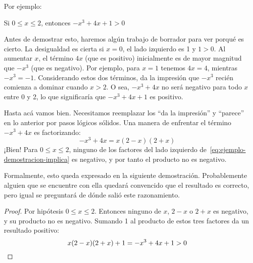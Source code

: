   Por ejemplo:
  \begin{proposition}
    Si \(0 \le x \le 2\),
    entonces \(-x^3 + 4 x + 1 > 0\)
  \end{proposition}
  Antes de demostrar esto,
  haremos algún trabajo de borrador para ver porqué es cierto.
  La desigualdad es cierta si \(x = 0\),
  el lado izquierdo es 1 y \(1 > 0\).
  Al aumentar \(x\),
  el término \(4 x\)
  (que es positivo)
  inicialmente es de mayor magnitud que \(-x^3\)
  (que es negativo).
  Por ejemplo,
  para \(x = 1\) tenemos \(4 x = 4\),
  mientras \(-x^3 = -1\).
  Considerando estos dos términos,
  da la impresión que \(-x^3\)
  recién comienza a dominar cuando \(x > 2\).
  O sea,
  \(-x^3 + 4 x\) no será negativo para todo \(x\) entre 0 y 2,
  lo que significaría que \(-x^3 + 4 x + 1\) es positivo.

  Hasta acá vamos bien.
  Necesitamos reemplazar los ``da la impresión'' y ``parece''
  en lo anterior por pasos lógicos sólidos.
  Una manera de enfrentar el término \(-x^3 + 4 x\) es factorizando:
  \begin{equation}
    \label{eq:ejemplo-demostracion-implica}
    -x^3 + 4 x = x (2 - x) (2 + x)
  \end{equation}
  ¡Bien!
  Para \(0 \le x \le 2\),
  ninguno de los factores
  del lado izquierdo de~\eqref{eq:ejemplo-demostracion-implica}
  es negativo,
  y por tanto el producto no es negativo.

  Formalmente,
  esto queda expresado en la siguiente demostración.
  Probablemente alguien que se encuentre con ella quedará convencido
  que el resultado es correcto,
  pero igual se preguntará de dónde salió este razonamiento.

  \begin{proof}
    Por hipótesis \(0 \le x \le 2\).
    Entonces ninguno de \(x\), \(2 - x\) o \(2 + x\) es negativo,
    y su producto no es negativo.
    Sumando 1 al producto de estos tres factores
    da un resultado positivo:
    \begin{equation*}
      x (2 - x) (2 + x) + 1 = -x^3 + 4 x + 1 > 0
      \qedhere
    \end{equation*}
  \end{proof}

